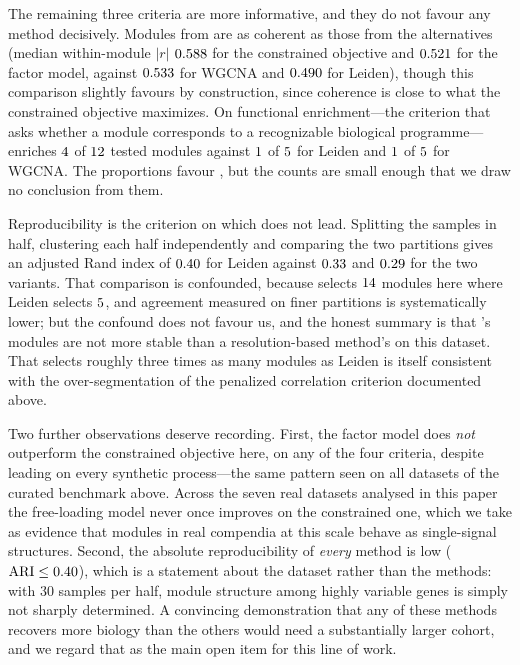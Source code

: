 The remaining three criteria are more informative, and they do not favour any
method decisively. Modules from \tool{} are as coherent as those from the
alternatives (median within-module $\lvert r\rvert$ $0.588{}$ for the
constrained objective and $0.521{}$ for the factor model, against
$0.533{}$ for WGCNA and $0.490{}$ for Leiden), though this
comparison slightly favours \tool{} by construction, since coherence is close to
what the constrained objective maximizes. On functional enrichment---the
criterion that asks whether a module corresponds to a recognizable biological
programme---\tool{} enriches $4{}$ of $12{}$
tested modules against $1{}$ of $5{}$ for
Leiden and $1{}$ of $5{}$ for WGCNA. The
proportions favour \tool{}, but the counts are small enough that we draw no
conclusion from them.

Reproducibility is the criterion on which \tool{} does not lead. Splitting the
samples in half, clustering each half independently and comparing the two
partitions gives an adjusted Rand index of $0.40{}$ for Leiden
against $0.33{}$ and $0.29{}$ for the two \tool{}
variants. That comparison is confounded, because \tool{} selects
$14{}$ modules here where Leiden selects $5{}$, and
agreement measured on finer partitions is systematically lower; but the confound
does not favour us, and the honest summary is that \tool{}'s modules are not more
stable than a resolution-based method's on this dataset. That \tool{} selects
roughly three times as many modules as Leiden is itself consistent with the
over-segmentation of the penalized correlation criterion documented above.

Two further observations deserve recording. First, the factor model does
\emph{not} outperform the constrained objective here, on any of the four
criteria, despite leading on every synthetic process---the same pattern seen on
all \SaelensNDatasets{} datasets of the curated benchmark above. Across the seven
real datasets analysed in this paper the free-loading model never once improves on
the constrained one, which we take as evidence that modules in real compendia at
this scale behave as single-signal structures. Second,
the absolute reproducibility of \emph{every} method is low
($\text{ARI} \le 0.40{}$), which is a statement about the dataset
rather than the methods: with 30 samples per half, module structure among
\EmpCompNTop{} highly variable genes is simply not sharply determined. A
convincing demonstration that any of these methods recovers more biology than the
others would need a substantially larger cohort, and we regard that as the main
open item for this line of work.

